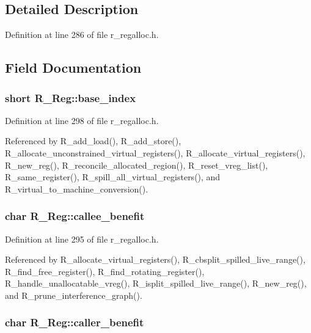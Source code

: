 \subsection{Detailed Description}




Definition at line 286 of file r\_\-regalloc.h.

\subsection{Field Documentation}
\subsubsection{\setlength{\rightskip}{0pt plus 5cm}short \bf{R\_\-Reg::base\_\-index}}\label{structR__Reg_9e8ee5633b03bc357ecae77bf8a1a350}




Definition at line 298 of file r\_\-regalloc.h.

Referenced by R\_\-add\_\-load(), R\_\-add\_\-store(), R\_\-allocate\_\-unconstrained\_\-virtual\_\-registers(), R\_\-allocate\_\-virtual\_\-registers(), R\_\-new\_\-reg(), R\_\-reconcile\_\-allocated\_\-region(), R\_\-reset\_\-vreg\_\-list(), R\_\-same\_\-register(), R\_\-spill\_\-all\_\-virtual\_\-registers(), and R\_\-virtual\_\-to\_\-machine\_\-conversion().
\subsubsection{\setlength{\rightskip}{0pt plus 5cm}char \bf{R\_\-Reg::callee\_\-benefit}}\label{structR__Reg_60bb521ba5f19bcaf9f69eccaee58ad7}




Definition at line 295 of file r\_\-regalloc.h.

Referenced by R\_\-allocate\_\-virtual\_\-registers(), R\_\-cbsplit\_\-spilled\_\-live\_\-range(), R\_\-find\_\-free\_\-register(), R\_\-find\_\-rotating\_\-register(), R\_\-handle\_\-unallocatable\_\-vreg(), R\_\-isplit\_\-spilled\_\-live\_\-range(), R\_\-new\_\-reg(), and R\_\-prune\_\-interference\_\-graph().
\subsubsection{\setlength{\rightskip}{0pt plus 5cm}char \bf{R\_\-Reg::caller\_\-benefit}}\label{structR__Reg_e5352d099c8591d0851dc053cd15e5d5}




